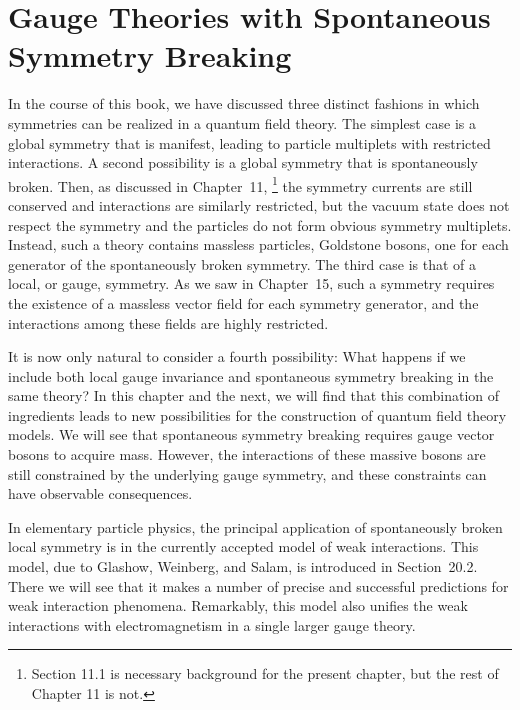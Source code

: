 \chapter{Gauge Theories with Spontaneous Symmetry Breaking}

In the course of this book, we have discussed three distinct fashions in which
symmetries can be realized in a quantum field theory.  The simplest case is a
global symmetry that is manifest, leading to particle multiplets with
restricted interactions.  A second possibility is a global symmetry that is
spontaneously broken.  Then, as discussed in Chapter~11,%
\footnote{Section 11.1 is necessary background for the present chapter, but
the rest of Chapter 11 is not.} the symmetry currents are still conserved and
interactions are similarly restricted, but the vacuum state does not respect
the symmetry and the particles do not form obvious symmetry multiplets.
Instead, such a theory contains massless particles, Goldstone bosons, one for
each generator of the spontaneously broken symmetry.  The third case is that
of a local, or gauge, symmetry.  As we saw in Chapter~15, such a symmetry
requires the existence of a massless vector field for each symmetry generator,
and the interactions among these fields are highly restricted.

It is now only natural to consider a fourth possibility: What happens if we
include both local gauge invariance and spontaneous symmetry breaking in the
same theory?  In this chapter and the next, we will find that this combination
of ingredients leads to new possibilities for the construction of quantum field
theory models.  We will see that spontaneous symmetry breaking requires gauge
vector bosons to acquire mass.  However, the interactions of these massive
bosons are still constrained by the underlying gauge symmetry, and these
constraints can have observable consequences.

In elementary particle physics, the principal application of spontaneously
broken local symmetry is in the currently accepted model of weak
interactions.  This model, due to Glashow, Weinberg, and Salam, is introduced
in Section~20.2.  There we will see that it makes a number of precise and
successful predictions for weak interaction phenomena.  Remarkably, this
model also unifies the weak interactions with electromagnetism in a single
larger gauge theory.

